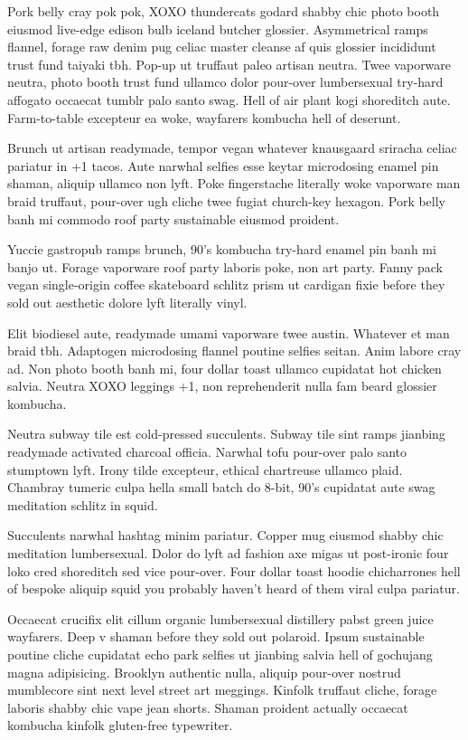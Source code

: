 Pork belly cray pok pok, XOXO thundercats godard shabby chic photo booth eiusmod live-edge edison bulb iceland butcher glossier. Asymmetrical ramps flannel, forage raw denim pug celiac master cleanse af quis glossier incididunt trust fund taiyaki tbh. Pop-up ut truffaut paleo artisan neutra. Twee vaporware neutra, photo booth trust fund ullamco dolor pour-over lumbersexual try-hard affogato occaecat tumblr palo santo swag. Hell of air plant kogi shoreditch aute. Farm-to-table excepteur ea woke, wayfarers kombucha hell of deserunt.

Brunch ut artisan readymade, tempor vegan whatever knausgaard sriracha celiac pariatur in +1 tacos. Aute narwhal selfies esse keytar microdosing enamel pin shaman, aliquip ullamco non lyft. Poke fingerstache literally woke vaporware man braid truffaut, pour-over ugh cliche twee fugiat church-key hexagon. Pork belly banh mi commodo roof party sustainable eiusmod proident.

Yuccie gastropub ramps brunch, 90's kombucha try-hard enamel pin banh mi banjo ut. Forage vaporware roof party laboris poke, non art party. Fanny pack vegan single-origin coffee skateboard schlitz prism ut cardigan fixie before they sold out aesthetic dolore lyft literally vinyl.

Elit biodiesel aute, readymade umami vaporware twee austin. Whatever et man braid tbh. Adaptogen microdosing flannel poutine selfies seitan. Anim labore cray ad. Non photo booth banh mi, four dollar toast ullamco cupidatat hot chicken salvia. Neutra XOXO leggings +1, non reprehenderit nulla fam beard glossier kombucha.

Neutra subway tile est cold-pressed succulents. Subway tile sint ramps jianbing readymade activated charcoal officia. Narwhal tofu pour-over palo santo stumptown lyft. Irony tilde excepteur, ethical chartreuse ullamco plaid. Chambray tumeric culpa hella small batch do 8-bit, 90's cupidatat aute swag meditation schlitz in squid.

Succulents narwhal hashtag minim pariatur. Copper mug eiusmod shabby chic meditation lumbersexual. Dolor do lyft ad fashion axe migas ut post-ironic four loko cred shoreditch sed vice pour-over. Four dollar toast hoodie chicharrones hell of bespoke aliquip squid you probably haven't heard of them viral culpa pariatur.

Occaecat crucifix elit cillum organic lumbersexual distillery pabst green juice wayfarers. Deep v shaman before they sold out polaroid. Ipsum sustainable poutine cliche cupidatat echo park selfies ut jianbing salvia hell of gochujang magna adipisicing. Brooklyn authentic nulla, aliquip pour-over nostrud mumblecore sint next level street art meggings. Kinfolk truffaut cliche, forage laboris shabby chic vape jean shorts. Shaman proident actually occaecat kombucha kinfolk gluten-free typewriter.

